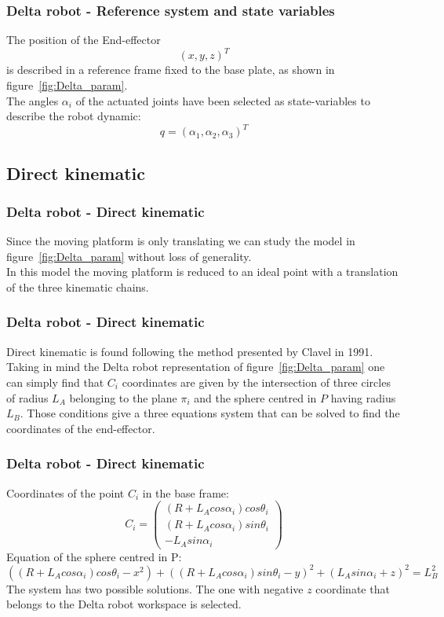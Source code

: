 %
\begin{frame}
\frametitle{Delta robot - Reference system and state variables}
The position of the End-effector
\[
(x,y,z)^T
\]
is described in a reference frame fixed to the base plate, as shown in figure~\ref{fig:Delta_param}.\\
\vspace{.5cm}
The angles $\alpha_i$ of the actuated joints have been selected as state-variables to describe the robot dynamic:
\[
q = (\alpha_1, \alpha_2, \alpha_3)^T
\]

\end{frame}
%
\subsection{Direct kinematic}
%
\begin{frame}
\frametitle{Delta robot - Direct kinematic}
Since the moving platform is only translating we can study the model in figure~\ref{fig:Delta_param} without loss of generality.\\
In this model the moving platform is reduced to an ideal point with a translation of the three kinematic chains.
\end{frame}
%
\begin{frame}
\frametitle{Delta robot - Direct kinematic}
Direct kinematic is found following the method presented by Clavel in 1991.\\
Taking in mind the Delta robot representation of figure~\ref{fig:Delta_param} one can simply find that $C_i$ coordinates are given by the intersection of three circles of radius $L_A$ belonging to the plane $\pi_i$ and the sphere centred in $P$ having radius $L_B$. Those conditions give a three equations system that can be solved to find the coordinates of the end-effector.
\end{frame}
%
\begin{frame}
\frametitle{Delta robot - Direct kinematic}
%
Coordinates of the point $C_i$ in the base frame:
\begin{equation}
C_i =%
\begin{pmatrix}
	(R + L_Acos\alpha_i)cos\theta_i\\
	(R + L_Acos\alpha_i)sin\theta_i\\
	-L_Asin\alpha_i
\end{pmatrix}
\end{equation}
%
Equation of the sphere centred in P:
%
\small
\begin{equation}
	\left(\left(R + L_Acos\alpha_i\right)cos\theta_i - x^2\right) + \left(\left(R + L_Acos\alpha_i\right)sin\theta_i - y\right)^2 + \left(L_Asin\alpha_i + z\right)^2 = L_B^2
\end{equation}
\normalsize
The system has two possible solutions. The one with negative $z$ coordinate that belongs to the Delta robot workspace is selected.
\end{frame}
